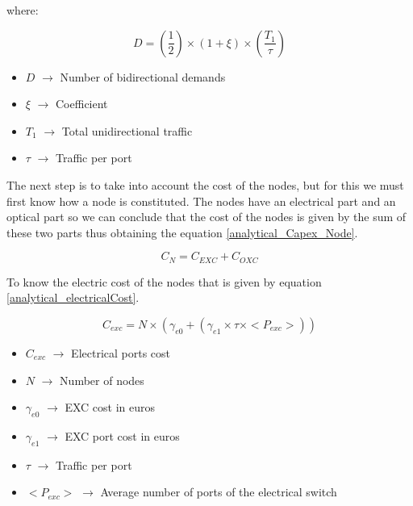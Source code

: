 where:

\begin{equation}
D = \left(\frac{1}{2}\right) \times \left( 1 + \xi \right) \times \left(\frac{T_1}{\tau}\right)
\label{demands}
\end{equation}


\begin{itemize}
\item{$D$  		$\rightarrow$ Number of bidirectional demands}
\item{$\xi$		$\rightarrow$ Coefficient}
\item{$T_1$		$\rightarrow$ Total unidirectional traffic}	
\item{$\tau$	$\rightarrow$ Traffic per port}
\end{itemize}

\vspace{11pt}
The next step is to take into account the cost of the nodes, but for this we must first know how a node is constituted. The nodes have an electrical part and an optical part so we can conclude that the cost of the nodes is given by the sum of these two parts thus obtaining the equation \ref{analytical_Capex_Node}.

\begin{equation}
C_N = C_{EXC} + C_{OXC}
\label{analytical_Capex_Node}
\end{equation}

\vspace{11pt}
To know the electric cost of the nodes that is given by equation \ref{analytical_electricalCost}.

\begin{equation}
C_{exc} = N \times \left( \gamma_{e0} + \left( \gamma_{e1} \times \tau \times <P_{exc}> \right) \right)
\label{analytical_electricalCost}
\end{equation}


\begin{itemize}
\item{$C_{exc}$		$\rightarrow$	Electrical ports cost}
\item{$N$			$\rightarrow$	Number of nodes}
\item{$\gamma_{e0}$	$\rightarrow$	EXC cost in euros}
\item{$\gamma_{e1}$	$\rightarrow$	EXC port cost in euros}
\item{$\tau$		$\rightarrow$	Traffic per port}
\item{$<P_{exc}>$   $\rightarrow$   Average number of ports of the electrical switch}
\end{itemize}

